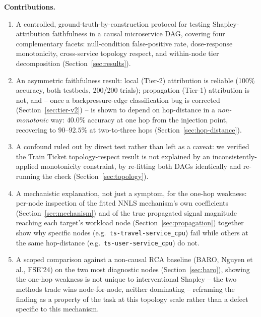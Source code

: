 \documentclass[journal, 10pt]{IEEEtran}
\begin{document}
\textbf{Contributions.}
\begin{enumerate}
    \item A controlled, ground-truth-by-construction protocol for testing
    Shapley-attribution faithfulness in a causal microservice DAG, covering
    four complementary facets: null-condition false-positive rate,
    dose-response monotonicity, cross-service topology respect, and
    within-node tier decomposition (Section~\ref{sec:results}).
    \item An asymmetric faithfulness result: local (Tier-2) attribution is
    reliable (100\% accuracy, both testbeds, 200/200 trials); propagation
    (Tier-1) attribution is not, and -- once a backpressure-edge
    classification bug is corrected (Section~\ref{sec:tier-v2}) -- is shown
    to depend on hop-distance in a \emph{non-monotonic} way: $40.0\%$
    accuracy at one hop from the injection point, recovering to
    $90$--$92.5\%$ at two-to-three hops (Section~\ref{sec:hop-distance}).
    \item A confound ruled out by direct test rather than left as a caveat:
    we verified the Train Ticket topology-respect result is not explained by
    an inconsistently-applied monotonicity constraint, by re-fitting both
    DAGs identically and re-running the check (Section~\ref{sec:topology}).
    \item A mechanistic explanation, not just a symptom, for the one-hop
    weakness: per-node inspection of the fitted NNLS mechanism's own
    coefficients (Section~\ref{sec:mechanism}) and of the true propagated
    signal magnitude reaching each target's workload node
    (Section~\ref{sec:propagation}) together show why specific nodes
    (e.g.\ \texttt{ts-travel-service\_cpu}) fail while others at the same
    hop-distance (e.g.\ \texttt{ts-user-service\_cpu}) do not.
    \item A scoped comparison against a non-causal RCA baseline (BARO,
    Nguyen et al., FSE'24) on the two most diagnostic nodes
    (Section~\ref{sec:baro}), showing the one-hop weakness is not unique to
    interventional Shapley -- the two methods trade wins node-for-node,
    neither dominating -- reframing the finding as a property of the task
    at this topology scale rather than a defect specific to this mechanism.
\end{enumerate}

\end{document}
